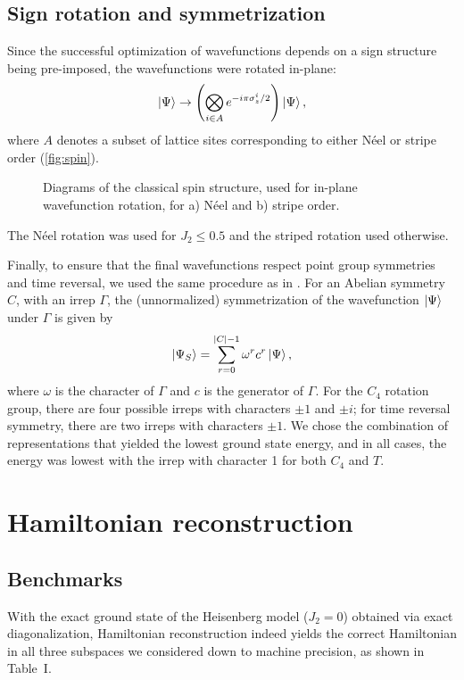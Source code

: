 \documentclass[amsmath,amssymb,aps,prb,superscriptaddress,onecolumn,floatfix]{revtex4}
\begin{document}
\subsection{Sign rotation and symmetrization}

Since the successful optimization of wavefunctions depends on a sign structure being pre-imposed, the wavefunctions were rotated in-plane:
\begin{equation}
     \ket{\Psi} \to \left( \bigotimes_{i \in A} e^{-i \pi \sigma^i_z / 2} \right) \ket{\Psi},
\end{equation}
where $A$ denotes a subset of lattice sites corresponding to either N\'{e}el or stripe order (\autoref{fig:spin}).
\begin{figure*}
\centering
    \caption{Diagrams of the classical spin structure, used for in-plane wavefunction rotation, for a) N\'{e}el and b) stripe order.}
    \label{fig:spin}
\end{figure*}
The N\'{e}el rotation was used for $J_2 \leq 0.5$ and the striped rotation used otherwise.

Finally, to ensure that the final wavefunctions respect point group symmetries and time reversal, we used the same procedure as in \cite{PhysRevB.100.125124}.
For an Abelian symmetry $C$, with an irrep $\Gamma$, the (unnormalized) symmetrization of the wavefunction $\ket{\Psi}$ under $\Gamma$ is given by
\begin{equation}
    \ket{\Psi_S} = \sum_{r=0}^{|C| - 1} \omega^r c^r \ket{\Psi},
\end{equation}
where $\omega$ is the character of $\Gamma$ and $c$ is the generator of $\Gamma$.
For the $C_4$ rotation group, there are four possible irreps with characters $\pm 1$ and $\pm i$; for time reversal symmetry, there are two irreps with characters $\pm 1$.
We chose the combination of representations that yielded the lowest ground state energy, and in all cases, the energy was lowest with the irrep with character 1 for both $C_4$ and $T$.

\section{Hamiltonian reconstruction}
\subsection{Benchmarks}
With the exact ground state of the Heisenberg model ($J_2=0$) obtained via exact diagonalization, Hamiltonian reconstruction indeed yields the correct Hamiltonian in all three subspaces we considered down to machine precision, as shown in Table~I.
\end{document}
